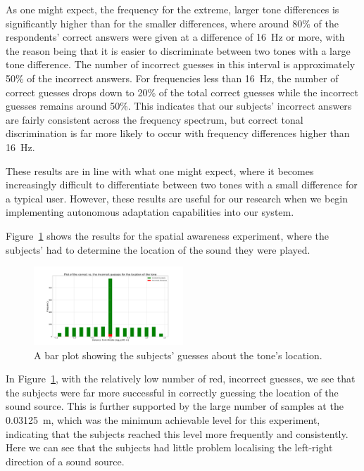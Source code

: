 \documentclass[format=sigconf, review=true, screen=true, anonymous=true]{acmart}
\begin{document}
As one might expect, the frequency for the extreme, larger tone differences is significantly higher than for the smaller differences, where around 80\% of the respondents' correct answers were given at a difference of \SI{16}{\hertz} or more, with the reason being that it is easier to discriminate between two tones with a large tone difference. The number of incorrect guesses in this interval is approximately 50\% of the incorrect answers. For frequencies less than \SI{16}{\hertz}, the number of correct guesses drops down to 20\% of the total correct guesses while the incorrect guesses remains around 50\%. This indicates that our subjects' incorrect answers are fairly consistent across the frequency spectrum, but correct tonal discrimination is far more likely to occur with frequency differences higher than \SI{16}{\hertz}.  

These results are in line with what one might expect, where it becomes increasingly difficult to differentiate between two tones with a small difference for a typical user. However, these results are useful for our research when we begin implementing autonomous adaptation capabilities into our system. 

Figure~\ref{fig:location-guesses} shows the results for the spatial awareness experiment, where the subjects' had to determine the location of the sound they were played. 

\begin{figure}
  \centering
  \includegraphics[width=0.5\textwidth]{figures/location_guesses.png}
  \caption{A bar plot showing the subjects' guesses about the tone's location.}
  \label{fig:location-guesses}
\end{figure}

In Figure~\ref{fig:location-guesses}, with the relatively low number of red, incorrect guesses, we see that the subjects were far more successful in correctly guessing the location of the sound source. This is further supported by the large number of samples at the \SI{0.03125}{\m}, which was the minimum achievable level for this experiment, indicating that the subjects reached this level more frequently and consistently. Here we can see that the subjects had little problem localising the left-right direction of a sound source. 
\end{document}
